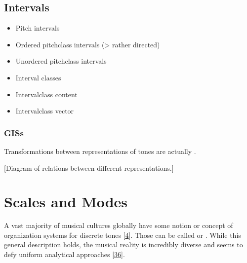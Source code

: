 \documentclass[letterpaper,10pt,english]{sphinxmanual}
\begin{document}
\section{Intervals}
\label{\detokenize{1_fundamentals:intervals}}\label{\detokenize{1_fundamentals:id6}}\begin{itemize}
\item {} 
\sphinxAtStartPar
Pitch intervals

\item {} 
\sphinxAtStartPar
Ordered pitch\sphinxhyphen{}class intervals (\sphinxhyphen{}\textgreater{} rather directed)

\item {} 
\sphinxAtStartPar
Unordered pitch\sphinxhyphen{}class intervals

\item {} 
\sphinxAtStartPar
Interval classes

\item {} 
\sphinxAtStartPar
Interval\sphinxhyphen{}class content

\item {} 
\sphinxAtStartPar
Interval\sphinxhyphen{}class vector

\end{itemize}


\subsection{GISs}
\label{\detokenize{1_fundamentals:giss}}\label{\detokenize{1_fundamentals:sec-gis}}
\sphinxAtStartPar
Transformations between representations of tones are actually .

\sphinxAtStartPar
{[}Diagram of relations between different representations.{]}


\chapter{Scales and Modes}
\label{\detokenize{2_scales_modes:scales-and-modes}}\label{\detokenize{2_scales_modes::doc}}
\sphinxAtStartPar
A vast majority of musical cultures globally have some notion or
concept of organization systems for discrete tones
{[}\hyperlink{cite.8_bibliography:id53}{4}{]}. Those can be called 
or . While this general description holds, the musical reality is
incredibly diverse and seems to defy uniform analytical approaches
{[}\hyperlink{cite.8_bibliography:id54}{36}{]}.
\end{document}
